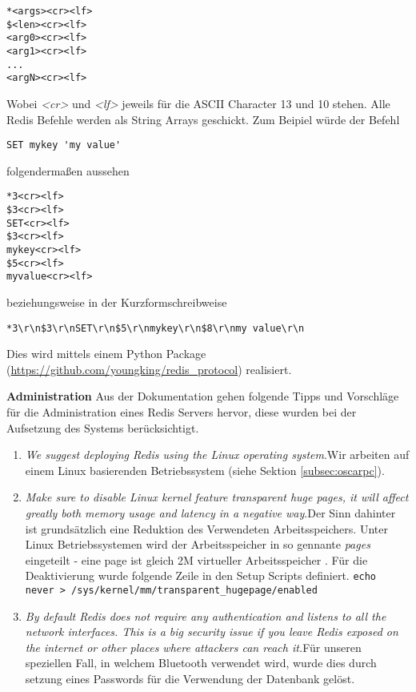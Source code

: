 \begin{lstlisting}[caption=RESP]
*<args><cr><lf>
$<len><cr><lf>
<arg0><cr><lf>
<arg1><cr><lf>
...
<argN><cr><lf>
\end{lstlisting}

Wobei \textit{<cr>} und \textit{<lf>} jeweils für die ASCII Character 13 und 10 stehen. Alle Redis Befehle werden als String Arrays geschickt. Zum Beipiel würde der Befehl

\tab\lstinline{SET mykey 'my value'} 

folgendermaßen aussehen

\begin{lstlisting}[caption=RESP Angewandt]
*3<cr><lf>
$3<cr><lf>
SET<cr><lf>
$3<cr><lf>
mykey<cr><lf>
$5<cr><lf>
myvalue<cr><lf>
\end{lstlisting}

beziehungsweise in der Kurzformschreibweise

\tab\lstinline{*3\r\n$3\r\nSET\r\n$5\r\nmykey\r\n$8\r\nmy value\r\n}

Dies wird mittels einem Python Package (\url{https://github.com/youngking/redis_protocol}) realisiert.

\textbf{Administration\newline}
Aus der Dokumentation \cite{MELD.CH3-redis.mainWebsite} gehen folgende Tipps und Vorschläge für die Administration eines Redis Servers hervor, diese wurden bei der Aufsetzung des Systems berücksichtigt.

\begin{enumerate}
\item \textit{We suggest deploying Redis using the Linux operating system}.\nextline Wir arbeiten auf einem Linux basierenden Betriebssystem (siehe Sektion \ref{subsec:oscarpc}).
\item \textit{Make sure to disable Linux kernel feature transparent huge pages, it will affect greatly both memory usage and latency in a negative way}.\nextline Der Sinn dahinter ist grundsätzlich eine Reduktion des Verwendeten Arbeitsspeichers. Unter Linux Betriebssystemen wird der Arbeitsspeicher in so gennante \textit{pages} eingeteilt - eine page ist gleich 2M virtueller Arbeitsspeicher \cite{MELD.CH3-redis.transhuge}. Für die Deaktivierung wurde folgende Zeile in den Setup Scripts definiert. \lstinline{echo never > /sys/kernel/mm/transparent_hugepage/enabled}
\item \textit{By default Redis does not require any authentication and listens to all the network interfaces. This is a big security issue if you leave Redis exposed on the internet or other places where attackers can reach it.}\nextline Für unseren speziellen Fall, in welchem Bluetooth verwendet wird, wurde dies durch setzung eines Passwords für die Verwendung der Datenbank gelöst.
\end{enumerate}

